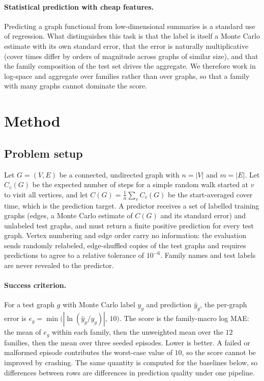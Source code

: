 \documentclass{article}
\begin{document}
\paragraph{Statistical prediction with cheap features.} Predicting a graph functional from low-dimensional summaries is a standard use of regression. What distinguishes this task is that the label is itself a Monte Carlo estimate with its own standard error, that the error is naturally multiplicative (cover times differ by orders of magnitude across graphs of similar size), and that the family composition of the test set drives the aggregate. We therefore work in log-space and aggregate over families rather than over graphs, so that a family with many graphs cannot dominate the score.

\section{Method}
\label{sec:method}

\subsection{Problem setup}
Let $G=(V,E)$ be a connected, undirected graph with $n=|V|$ and $m=|E|$. Let $C_v(G)$ be the expected number of steps for a simple random walk started at $v$ to visit all vertices, and let $C(G)=\frac1n\sum_{v}C_v(G)$ be the start-averaged cover time, which is the prediction target. A predictor receives a set of labelled training graphs (edges, a Monte Carlo estimate of $C(G)$ and its standard error) and unlabeled test graphs, and must return a finite positive prediction for every test graph. Vertex numbering and edge order carry no information: the evaluation sends randomly relabeled, edge-shuffled copies of the test graphs and requires predictions to agree to a relative tolerance of $10^{-6}$. %
Family names and test labels are never revealed to the predictor.

\paragraph{Success criterion.} For a test graph $g$ with Monte Carlo label $y_g$ and prediction $\hat y_g$, the per-graph error is $e_g=\min\!\big(|\ln(\hat y_g/y_g)|,\,10\big)$. The score is the family-macro log MAE: the mean of $e_g$ within each family, then the unweighted mean over the $12$ families, then the mean over three seeded episodes. Lower is better. A failed or malformed episode contributes the worst-case value of $10$, so the score cannot be improved by crashing. The same quantity is computed for the baselines below, so differences between rows are differences in prediction quality under one pipeline.
\end{document}
